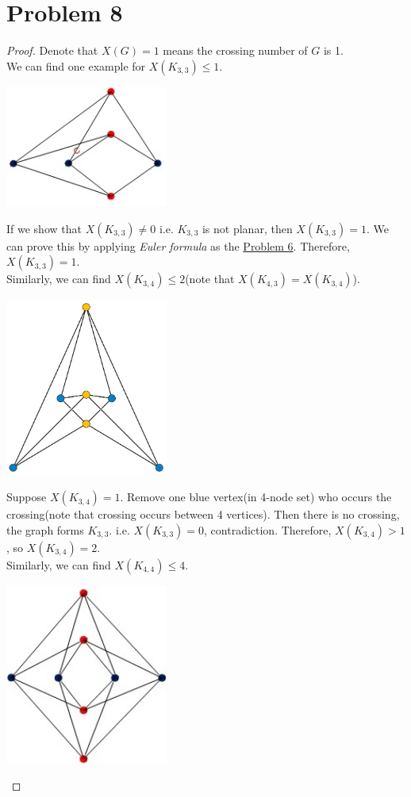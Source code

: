 \section*{Problem 8}
	\begin{proof}
		Denote that $X(G) = 1$ means the crossing number of $G$ is 1.\\
		We can find one example for $X(K_{3,3}) \leq 1$.
		\begin{center}
			\includegraphics[width=0.4\textwidth]{K33.jpg}
		\end{center}
		If we show that $X(K_{3,3}) \neq 0$ i.e. $K_{3,3}$ is not planar, then $X(K_{3,3}) = 1$. We can prove this by applying \textit{Euler formula} as the \hyperref[problem 6]{Problem 6}. Therefore, $X(K_{3,3}) = 1$.\\
		Similarly, we can find $X(K_{3,4}) \leq 2$(note that $X(K_{4,3}) = X(K_{3,4})$).
		\begin{center}
			\includegraphics[width=0.4\textwidth]{K43.png}
		\end{center}
		Suppose $X(K_{3,4}) = 1$. Remove one blue vertex(in 4-node set) who occurs the crossing(note that crossing occurs between 4 vertices). Then there is no crossing, the graph forms $K_{3,3}$. i.e. $X(K_{3,3}) = 0$, contradiction. Therefore, $X(K_{3,4}) > 1$, so $X(K_{3,4}) = 2$.\\
		Similarly, we can find $X(K_{4,4}) \leq 4$.
		\begin{center}
			\includegraphics[width=0.4\textwidth]{K44.jpg}

\end{center}
\end{proof}
